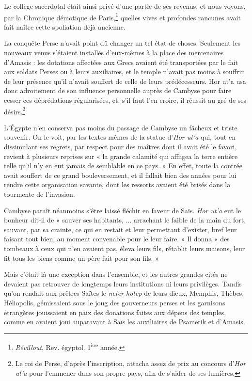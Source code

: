 \documentclass[a4paper, 11pt, oneside]{article}
\begin{document}
Le collège sacerdotal était ainsi privé d'une partie de ses revenus, et nous voyons, par la Chronique démotique de Paris,\footnote{\emph{Révillout}, Rev. égyptol. 1\textsuperscript{ère} année.} quelles vives et profondes rancunes avait fait naître cette spoliation déjà ancienne.

La conquête Perse n'avait point dû changer un tel état de choses. Seulement les nouveaux venus s'étaient installés d'eux-mêmes à la place des mercenaires d'Amasis : les dotations affectées aux Grecs avaient été transportées par le fait aux soldats Perses ou à leurs auxiliaires, et le temple n'avait pas moins à souffrir de leur présence qu'il n'avait souffert de celle de leurs prédécesseurs. Hor ut'a usa donc adroitement de son influence personnelle auprès de Cambyse pour faire cesser ces déprédations régularisées, et, s'il faut l'en croire, il réussit au gré de ses désirs.\footnote{Le roi de Perse, d'après l'inscription, attacha assez de prix au concours d'\emph{Hor ut'a} pour l'emmener dans son propre pays, afin de s'aider de ses lumières.}

L'Égypte n'en conserva pas moins du passage de Cambyse un fâcheux et triste souvenir. On le voit, par les textes mêmes de la statue d'\emph{Hor ut'a} qui, tout en dissimulant ses regrets, par respect pour des maîtres dont il avait été le favori, revient à plusieurs reprises sur « la grande calamité qui affligea la terre entière telle qu'il n'y en eut jamais de semblable en ce pays. » En effet, toute la contrée avait souffert de ce grand bouleversement, et il fallait bien des années pour lui rendre cette organisation savante, dont les ressorts avaient été brisés dans la tourmente de l'invasion.

Cambyse paraît néanmoins s'être laissé fléchir en faveur de Saïs. \emph{Hor ut'a} eut le bonheur dit-il de « sauver ses habitants, ... arrachant le faible de la main du fort, sauvant, par sa crainte, ce qui en restait et leur permettant d'exister, bref leur faisant tout bien, au moment convenable pour le leur faire. » Il donna « des tombeaux à ceux qui n'en avaient pas, éleva leurs fils, rétablit leurs maisons, leur fit tous les biens comme un père fait pour son fils. »

Mais c'était là une exception dans l'ensemble, et les autres grandes cités ne devaient pas retrouver de longtemps leurs institutions ni leurs privilèges. Tandis qu'on rendait aux prêtres Saïtes le \emph{neter hotep} de leurs dieux, Memphis, Thèbes, Héliopolis, gémissaient sous le joug des gouverneurs perses et les garnisons étrangères jouissaient en paix des donations faites aux dépens des temples, comme en avaient joui auparavant à Saïs les auxiliaires de Psametik et d'Amasis.
\end{document}
